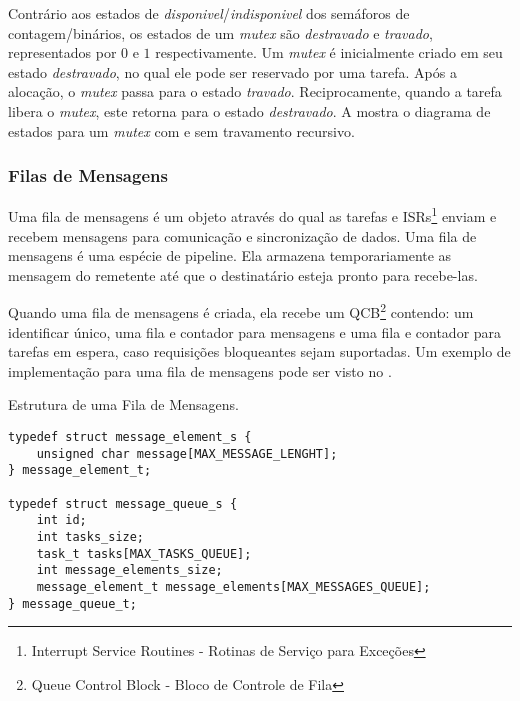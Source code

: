 Contrário aos estados de \emph{disponivel}/\emph{indisponivel} dos semáforos de contagem/binários, os estados de um \emph{mutex} são \emph{destravado} e \emph{travado}, representados por $0$ e $1$ respectivamente. Um \emph{mutex} é inicialmente criado em seu estado \emph{destravado}, no qual ele pode ser reservado por uma tarefa. Após a alocação, o \emph{mutex} passa para o estado \emph{travado}. Reciprocamente, quando a tarefa libera o \emph{mutex}, este retorna para o estado \emph{destravado}. A  mostra o diagrama de estados para um \emph{mutex} com e sem travamento recursivo.


\subsubsection{Filas de Mensagens}

Uma fila de mensagens é um objeto através do qual as tarefas e ISRs\footnote{Interrupt Service Routines - Rotinas de Serviço para Exceções} enviam e recebem mensagens para comunicação e sincronização de dados. Uma fila de mensagens é uma espécie de pipeline. Ela armazena temporariamente as mensagem do remetente até que o destinatário esteja pronto para recebe-las. %

Quando uma fila de mensagens é criada, ela recebe um QCB\footnote{Queue Control Block - Bloco de Controle de Fila} contendo: um identificar único, uma fila e contador para mensagens e uma fila e contador para tarefas em espera, caso requisições bloqueantes sejam suportadas. Um exemplo de implementação para uma fila de mensagens pode ser visto no .

\begin{listing}
	\caption{Estrutura de uma Fila de Mensagens.}
	\label{alg:struct_message_queue}
	\centering
	\begin{verbatim}
typedef struct message_element_s {
	unsigned char message[MAX_MESSAGE_LENGHT];	
} message_element_t;

typedef struct message_queue_s {
	int id;
	int tasks_size;
	task_t tasks[MAX_TASKS_QUEUE];
	int message_elements_size;
	message_element_t message_elements[MAX_MESSAGES_QUEUE];
} message_queue_t;
	\end{verbatim}
\end{listing}

